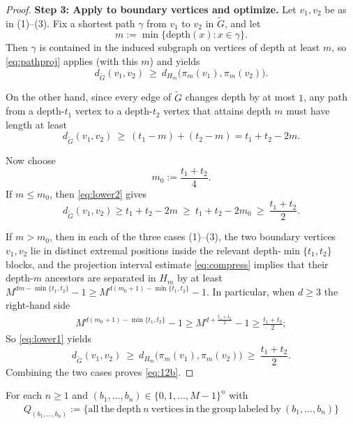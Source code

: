 \documentclass[11pt]{amsart}
\theoremstyle{plain}
\numberwithin{equation}{section}
\numberwithin{figure}{section}
\begin{document}
\begin{proof}
\smallskip
\noindent\textbf{Step 3: Apply to boundary vertices and optimize.}
Let $v_1,v_2$ be as in (1)--(3).
Fix a shortest path $\gamma$ from $v_1$ to $v_2$ in $\widetilde G$, and let
\[
m:=\min\{\mathrm{depth}(x): x\in \gamma\}.
\]
Then $\gamma$ is contained in the induced subgraph on vertices of depth at least $m$,
so \eqref{eq:pathproj} applies (with this $m$) and yields
\begin{equation}\label{eq:lower1}
d_{\widetilde G}(v_1,v_2)\ \ge\ d_{H_m}\bigl(\pi_m(v_1),\pi_m(v_2)\bigr).
\end{equation}

On the other hand, since every edge of $\widetilde G$ changes depth by at most $1$,
any path from a depth-$t_1$ vertex to a depth-$t_2$ vertex that attains depth $m$
must have length at least
\begin{equation}\label{eq:lower2}
d_{\widetilde G}(v_1,v_2)\ \ge\ (t_1-m)+(t_2-m)=t_1+t_2-2m.
\end{equation}

Now choose
\[
m_0:=\frac{t_1+t_2}{4}.
\]
If $m\le m_0$, then \eqref{eq:lower2} gives
\[
d_{\widetilde G}(v_1,v_2)\ge t_1+t_2-2m\ \ge\ t_1+t_2-2m_0
\ \ge\ \frac{t_1+t_2}{2}.
\]


If $m>m_0$, then in each of the three cases (1)--(3), the two boundary vertices $v_1,v_2$
lie in distinct extremal positions inside the relevant depth-$\min\{t_1,t_2\}$ blocks,
and the projection interval estimate \eqref{eq:compress} implies that their depth-$m$ ancestors
are separated in $H_m$ by at least $M^{dm-\min\{t_1,t_2\}}-1\ge M^{d(m_0+1)-\min\{t_1,t_2\}}-1$.
In particular, when $d\geq 3$ the right-hand side 
\begin{align*}
M^{d(m_0+1)-\min\{t_1,t_2\}}-1\geq M^{d+\frac{t_1+t_2}{2}}-1\geq \frac{t_1+t_2}{2};
\end{align*}
So \eqref{eq:lower1} yields
\[
d_{\widetilde G}(v_1,v_2)\ \ge\ d_{H_m}\bigl(\pi_m(v_1),\pi_m(v_2)\bigr)\ \ge\ \frac{t_1+t_2}{2}.
\]
Combining the two cases proves \eqref{eq:12b}.
\end{proof}











For each $n\geq 1$ and $(b_1,\ldots,b_{n})\in\{0,1,\ldots,M-1\}^{n}$ with
\begin{align*}
Q_{(b_1,
\ldots,b_{n})}:=\{\mathrm{all\ the\ depth\ } n\ \mathrm{vertices\ in\ the\ group\ labeled\ by}\ (b_1,\ldots,b_{n})\}
\end{align*}
\end{document}

